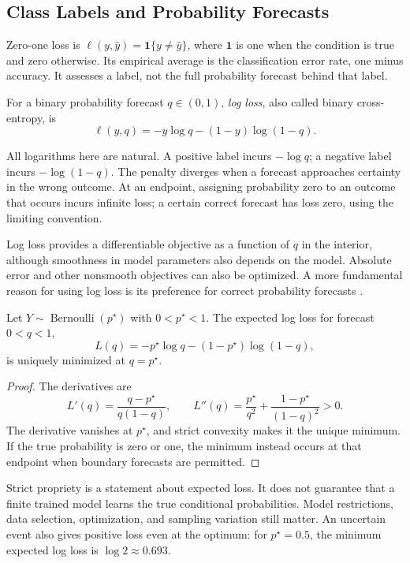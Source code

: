 \subsection{Class Labels and Probability Forecasts}

Zero-one loss is $\ell(y,\hat y)=\mathbf1\{y\ne\hat y\}$, where $\mathbf1$ is one when the condition is true and zero otherwise. Its empirical average is the classification error rate, one minus accuracy. It assesses a label, not the full probability forecast behind that label.

For a binary probability forecast $q\in(0,1)$, \emph{log loss}, also called binary cross-entropy, is
\[
\ell(y,q)=-y\log q-(1-y)\log(1-q).
\]
\begin{samepage}
All logarithms here are natural. A positive label incurs $-\log q$; a negative label incurs $-\log(1-q)$. The penalty diverges when a forecast approaches certainty in the wrong outcome. At an endpoint, assigning probability zero to an outcome that occurs incurs infinite loss; a certain correct forecast has loss zero, using the limiting convention.
\end{samepage}

Log loss provides a differentiable objective as a function of $q$ in the interior, although smoothness in model parameters also depends on the model. Absolute error and other nonsmooth objectives can also be optimized. A more fundamental reason for using log loss is its preference for correct probability forecasts \citep{gneiting2007}.

\begin{theorem}
Let $Y\sim\operatorname{Bernoulli}(p^\star)$ with $0<p^\star<1$. The expected log loss for forecast $0<q<1$,
\[
L(q)=-p^\star\log q-(1-p^\star)\log(1-q),
\]
is uniquely minimized at $q=p^\star$.
\end{theorem}

\begin{proof}
The derivatives are
\[
L'(q)=\frac{q-p^\star}{q(1-q)},\qquad
L''(q)=\frac{p^\star}{q^2}+\frac{1-p^\star}{(1-q)^2}>0.
\]
The derivative vanishes at $p^\star$, and strict convexity makes it the unique minimum. If the true probability is zero or one, the minimum instead occurs at that endpoint when boundary forecasts are permitted.
\end{proof}

Strict propriety is a statement about expected loss. It does not guarantee that a finite trained model learns the true conditional probabilities. Model restrictions, data selection, optimization, and sampling variation still matter. An uncertain event also gives positive loss even at the optimum: for $p^\star=0.5$, the minimum expected log loss is $\log2\approx0.693$.

